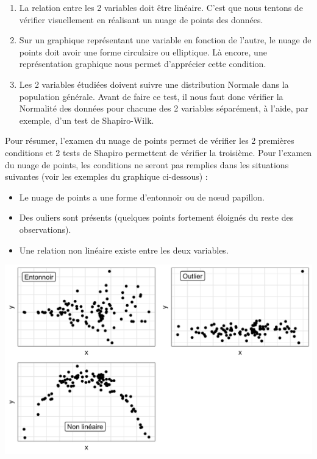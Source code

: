 \documentclass[
  a4paper,
]{article}
\providecommand{\tightlist}{%
  \setlength{\itemsep}{0pt}\setlength{\parskip}{0pt}}
\begin{document}
\begin{enumerate}
\def\labelenumi{\arabic{enumi}.}
\tightlist
\item
  La relation entre les 2 variables doit être linéaire. C'est que nous tentons de vérifier visuellement en réalisant un nuage de points des données.
\item
  Sur un graphique représentant une variable en fonction de l'autre, le nuage de points doit avoir une forme circulaire ou elliptique. Là encore, une représentation graphique nous permet d'apprécier cette condition.
\item
  Les 2 variables étudiées doivent suivre une distribution Normale dans la population générale. Avant de faire ce test, il nous faut donc vérifier la Normalité des données pour chacune des 2 variables séparément, à l'aide, par exemple, d'un test de Shapiro-Wilk.
\end{enumerate}

Pour résumer, l'examen du nuage de points permet de vérifier les 2 premières conditions et 2 tests de Shapiro permettent de vérifier la troisième. Pour l'examen du nuage de points, les conditions ne seront pas remplies dans les situations suivantes (voir les exemples du graphique ci-dessous) :

\begin{itemize}
\tightlist
\item
  Le nuage de points a une forme d'entonnoir ou de nœud papillon.
\item
  Des ouliers sont présents (quelques points fortement éloignés du reste des observations).
\item
  Une relation non linéaire existe entre les deux variables.
\end{itemize}

\begin{center}\includegraphics[width=0.9\linewidth]{figure/unnamed-chunk-107-1} \end{center}
\end{document}
